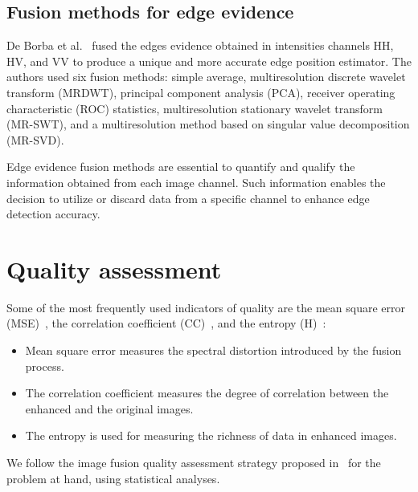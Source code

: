 \documentclass{article}
\begin{document}
\subsection{Fusion methods for edge evidence}
De Borba et al.~\cite{DeBorba2020} fused the edges evidence obtained in intensities channels HH, HV, and VV to produce a unique and more accurate edge position estimator. 
The authors used six fusion methods: simple average, multiresolution discrete wavelet transform (MRDWT), principal component analysis (PCA), receiver operating characteristic (ROC) statistics, multiresolution stationary wavelet transform (MR-SWT), and a multiresolution method based on singular value decomposition (MR-SVD).

Edge evidence fusion methods are essential to quantify and qualify the information obtained from each image channel. 
Such information enables the decision to utilize or discard data from a specific channel to enhance edge detection accuracy.
\vspace{-0.2cm}
\section{Quality assessment}
\vspace{-0.2cm}
    Some of the most frequently used indicators of quality are the mean square error (MSE)~\cite{beaulieu2003multi}, 
    the correlation coefficient (CC)~\cite{aiazzi2004spectral}, and the entropy (H)~\cite{han2008study}:
    \begin{itemize}
    \itemsep0em 
     \vspace{-0.1cm}\item Mean square error measures the spectral distortion introduced by the fusion process.
     \vspace{-0.2cm}\item The correlation coefficient measures the degree of correlation between the enhanced and the original images.
    \vspace{-0.2cm}\item The entropy is used for measuring the richness of data in enhanced images.
    \end{itemize}
    We follow the image fusion quality assessment strategy proposed in~\cite{Li2010,Nikola2015,Somvanshi2017} for the problem at hand, using statistical analyses.
    
\end{document}
